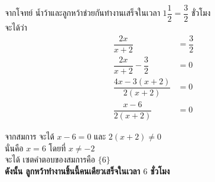 	\bigskip
	จากโจทย์ น้ำว้าและลูกหว้าช่วยกันทำงานเสร็จในเวลา $1 \dfrac{1}{2} = \dfrac{3}{2}$ ชั่วโมง \\
	จะได้ว่า
\[
\begin{aligned}
	\dfrac{2x}{x+2} &= \dfrac{3}{2} \\[8pt]
	\dfrac{2x}{x+2} - \dfrac{3}{2} &= 0 \\[8pt]
	\dfrac{4x - 3(x+2)}{2(x+2)} &= 0 \\[8pt]
	\dfrac{x-6}{2(x+2)} &= 0
\end{aligned}
\]
	
	\bigskip
	\noindent จากสมการ จะได้ $x-6 = 0$ และ $2(x+2) \neq 0$ \\
	นั่นคือ $x = 6$ โดยที่ $x \neq -2$ \\
	จะได้ เซตคำตอบของสมการคือ $\{6\}$ \\[6pt]
	\textbf{ดังนั้น ลูกหว้าทำงานชิ้นนี้คนเดียวเสร็จในเวลา $6$ ชั่วโมง}

\newpage

